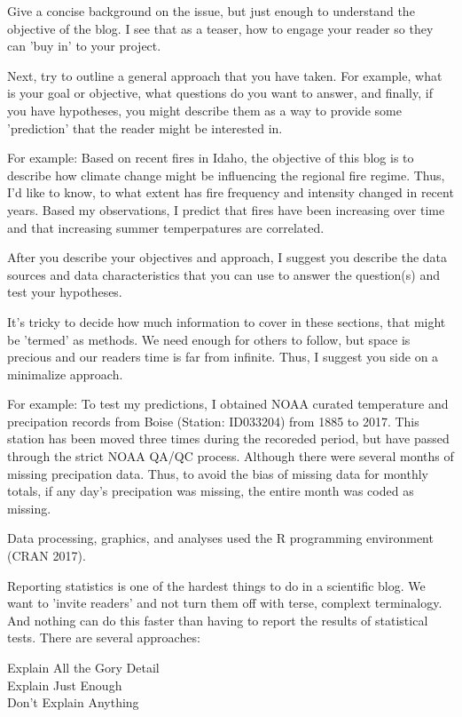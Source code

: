 \documentclass{tufte-handout}\usepackage[]{graphicx}\usepackage[]{color}
\begin{document}
Give a concise background on the issue, but just enough to understand the objective of the blog. I see that as a teaser, how to engage your reader so they can 'buy in' to your project.

Next, try to outline a general approach that you have taken. For example, what is your goal or objective, what questions do you want to answer, and finally, if you have hypotheses, you might describe them as a way to provide some 'prediction' that the reader might be interested in. 

For example: Based on recent fires in Idaho, the objective of this blog is to describe how climate change might be influencing the regional fire regime. Thus, I'd like to know, to what extent has fire frequency and intensity changed in recent years. Based my observations, I predict that fires have been increasing over time and that increasing summer temperpatures are correlated. 

After you describe your objectives and approach, I suggest you describe the data sources and data characteristics that you can use to answer the question(s) and test your hypotheses.

It's tricky to decide how much information to cover in these sections, that might be 'termed' as methods. We need enough for others to follow, but space is precious and our readers time is far from infinite. Thus, I suggest you side on a minimalize approach. 

For example: To test my predictions, I obtained NOAA curated temperature and precipation records from Boise (Station: ID033204) from 1885 to 2017. This station has been moved three times during the recoreded period, but have passed through the strict NOAA QA/QC process. Although there were several months of missing precipation data. Thus, to avoid the bias of missing data for monthly totals, if any day's precipation was missing, the entire month was coded as missing. 

Data processing, graphics, and analyses used the R programming environment (CRAN 2017). 

Reporting statistics is one of the hardest things to do in a scientific blog. We want to 'invite readers' and not turn them off with terse, complext terminalogy. And nothing can do this faster than having to report the results of statistical tests. There are several approaches:

\begin{description}
\item[Explain All the Gory Detail]
\item[Explain Just Enough]
\item[Don't Explain Anything]

\end{description}
\end{document}
